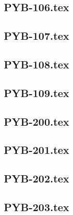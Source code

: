 \renewcommand{\xxexo}{PYB-106.tex} 
\subsection*{\xxexo} 
\graphicspath{{../../exos/python_bases/PYB-106/}}
 
 
\renewcommand{\xxexo}{PYB-107.tex} 
\subsection*{\xxexo} 
\graphicspath{{../../exos/python_bases/PYB-107/}}
 
 
\renewcommand{\xxexo}{PYB-108.tex} 
\subsection*{\xxexo} 
\graphicspath{{../../exos/python_bases/PYB-108/}}
 
 
\renewcommand{\xxexo}{PYB-109.tex} 
\subsection*{\xxexo} 
\graphicspath{{../../exos/python_bases/PYB-109/}}
 
 
\renewcommand{\xxexo}{PYB-200.tex} 
\subsection*{\xxexo} 
\graphicspath{{../../exos/python_bases/PYB-200/}}
 
 
\renewcommand{\xxexo}{PYB-201.tex} 
\subsection*{\xxexo} 
\graphicspath{{../../exos/python_bases/PYB-201/}}
 
 
\renewcommand{\xxexo}{PYB-202.tex} 
\subsection*{\xxexo} 
\graphicspath{{../../exos/python_bases/PYB-202/}}
 
 
\renewcommand{\xxexo}{PYB-203.tex} 
\subsection*{\xxexo} 
\graphicspath{{../../exos/python_bases/PYB-203/}}
 
 
